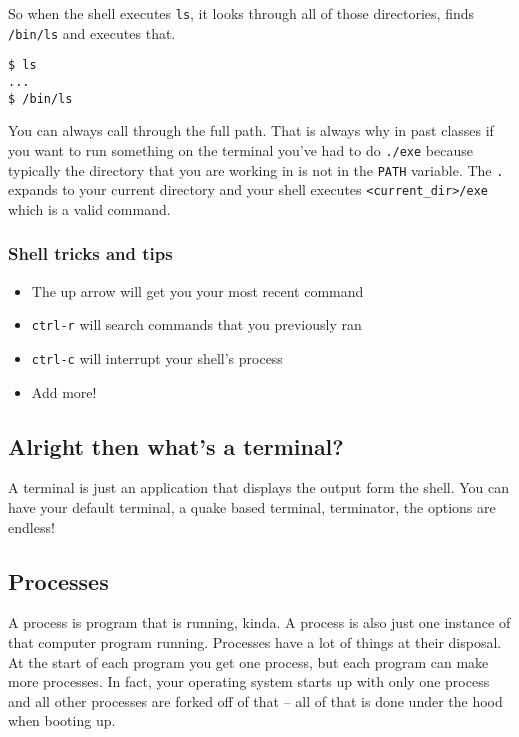So when the shell executes \texttt{ls}, it looks through all of those
directories, finds \texttt{/bin/ls} and executes that.

\begin{verbatim}
$ ls
...
$ /bin/ls
\end{verbatim}

You can always call through the full path. That is always why in past
classes if you want to run something on the terminal you've had to do
\texttt{./exe} because typically the directory that you are working in
is not in the \texttt{PATH} variable. The \texttt{.} expands to your
current directory and your shell executes
\texttt{\textless{}current\_dir\textgreater{}/exe} which is a valid
command.

\subsubsection{Shell tricks and tips}\label{shell-tricks-and-tips}

\begin{itemize}
\tightlist
\item
  The up arrow will get you your most recent command
\item
  \texttt{ctrl-r} will search commands that you previously ran
\item
  \texttt{ctrl-c} will interrupt your shell's process
\item
  Add more!
\end{itemize}

\subsection{Alright then what's a
terminal?}\label{alright-then-whats-a-terminal}

A terminal is just an application that displays the output form the
shell. You can have your default terminal, a quake based terminal,
terminator, the options are endless!

\subsection{Processes}\label{processes}

A process is program that is running, kinda. A process is also just one
instance of that computer program running. Processes have a lot of
things at their disposal. At the start of each program you get one
process, but each program can make more processes. In fact, your
operating system starts up with only one process and all other processes
are forked off of that -- all of that is done under the hood when
booting up.

